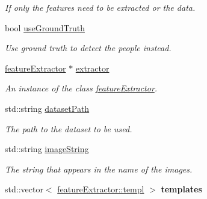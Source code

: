 \begin{DoxyCompactItemize}
\begin{DoxyCompactList}\small\item\em If only the features need to be extracted or the data. \item\end{DoxyCompactList}\item 
\hypertarget{classpeopleDetector_a22a0fec885724c49f9a0ed4f2c46d818}{
bool \hyperlink{classpeopleDetector_a22a0fec885724c49f9a0ed4f2c46d818}{useGroundTruth}}
\label{classpeopleDetector_a22a0fec885724c49f9a0ed4f2c46d818}

\begin{DoxyCompactList}\small\item\em Use ground truth to detect the people instead. \item\end{DoxyCompactList}\item 
\hypertarget{classpeopleDetector_a4a1fe12e7562945fdead71b260fbd60e}{
\hyperlink{classfeatureExtractor}{featureExtractor} $\ast$ \hyperlink{classpeopleDetector_a4a1fe12e7562945fdead71b260fbd60e}{extractor}}
\label{classpeopleDetector_a4a1fe12e7562945fdead71b260fbd60e}

\begin{DoxyCompactList}\small\item\em An instance of the class \hyperlink{classfeatureExtractor}{featureExtractor}. \item\end{DoxyCompactList}\item 
\hypertarget{classpeopleDetector_afcb4ef445c08db0a18c8f3e8f223af71}{
std::string \hyperlink{classpeopleDetector_afcb4ef445c08db0a18c8f3e8f223af71}{datasetPath}}
\label{classpeopleDetector_afcb4ef445c08db0a18c8f3e8f223af71}

\begin{DoxyCompactList}\small\item\em The path to the dataset to be used. \item\end{DoxyCompactList}\item 
\hypertarget{classpeopleDetector_a4bb1b20a12c370c54f8fc546aeb67b97}{
std::string \hyperlink{classpeopleDetector_a4bb1b20a12c370c54f8fc546aeb67b97}{imageString}}
\label{classpeopleDetector_a4bb1b20a12c370c54f8fc546aeb67b97}

\begin{DoxyCompactList}\small\item\em The string that appears in the name of the images. \item\end{DoxyCompactList}\item 
\hypertarget{classpeopleDetector_a596731aabeb220301dce4cadb4f2f5c4}{
std::vector$<$ \hyperlink{structfeatureExtractor_1_1templ}{featureExtractor::templ} $>$ {\bfseries templates}}
\label{classpeopleDetector_a596731aabeb220301dce4cadb4f2f5c4}

\end{DoxyCompactItemize}


